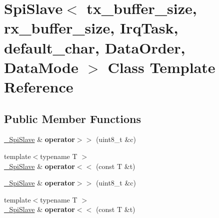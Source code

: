 \hypertarget{classSpiSlave}{}\section{Spi\+Slave$<$ tx\+\_\+buffer\+\_\+size, rx\+\_\+buffer\+\_\+size, Irq\+Task, default\+\_\+char, Data\+Order, Data\+Mode $>$ Class Template Reference}
\label{classSpiSlave}
\subsection*{Public Member Functions}
\begin{DoxyCompactItemize}
\item 
\hypertarget{classSpiSlave_aa1cecfc282b2950f542269d48de0f30c}{}\label{classSpiSlave_aa1cecfc282b2950f542269d48de0f30c} 
\hyperlink{classSpiSlave}{\+\_\+\+Spi\+Slave} \& {\bfseries operator$>$$>$} (uint8\+\_\+t \&c)
\item 
\hypertarget{classSpiSlave_abcaf373a5ffd770c2c2b7f4bbf72beb3}{}\label{classSpiSlave_abcaf373a5ffd770c2c2b7f4bbf72beb3} 
{\footnotesize template$<$typename T $>$ }\\\hyperlink{classSpiSlave}{\+\_\+\+Spi\+Slave} \& {\bfseries operator$<$$<$} (const T \&t)
\item 
\hypertarget{classSpiSlave_aa1cecfc282b2950f542269d48de0f30c}{}\label{classSpiSlave_aa1cecfc282b2950f542269d48de0f30c} 
\hyperlink{classSpiSlave}{\+\_\+\+Spi\+Slave} \& {\bfseries operator$>$$>$} (uint8\+\_\+t \&c)
\item 
\hypertarget{classSpiSlave_abcaf373a5ffd770c2c2b7f4bbf72beb3}{}\label{classSpiSlave_abcaf373a5ffd770c2c2b7f4bbf72beb3} 
{\footnotesize template$<$typename T $>$ }\\\hyperlink{classSpiSlave}{\+\_\+\+Spi\+Slave} \& {\bfseries operator$<$$<$} (const T \&t)
\end{DoxyCompactItemize}
